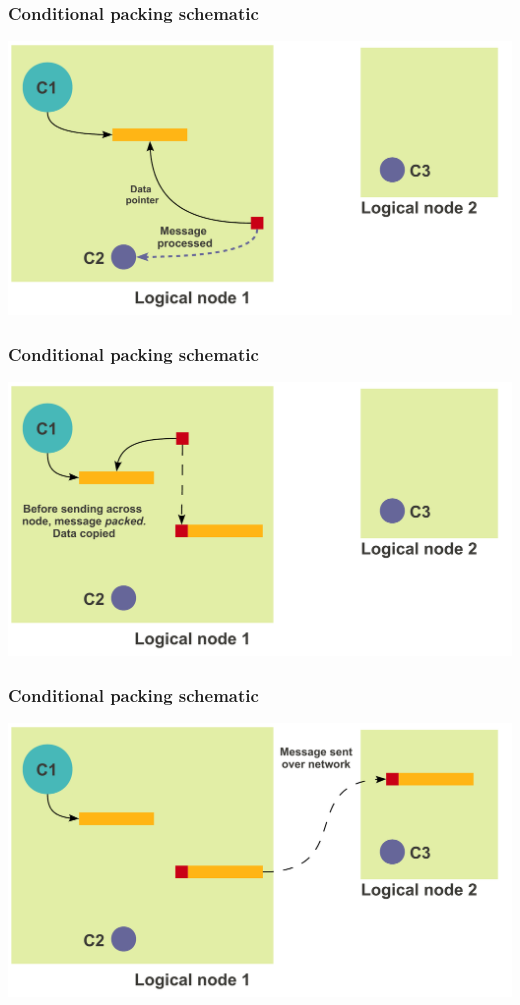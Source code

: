 \begin{frame}[fragile]
  \frametitle{Conditional packing schematic}
  \includegraphics[width=\textwidth]{figures/advancedOpts/fig2_2}
\end{frame}

\begin{frame}[fragile]
  \frametitle{Conditional packing schematic}
  \includegraphics[width=\textwidth]{figures/advancedOpts/fig3}
\end{frame}

\begin{frame}[fragile]
  \frametitle{Conditional packing schematic}
  \includegraphics[width=\textwidth]{figures/advancedOpts/fig3_1}
\end{frame}

